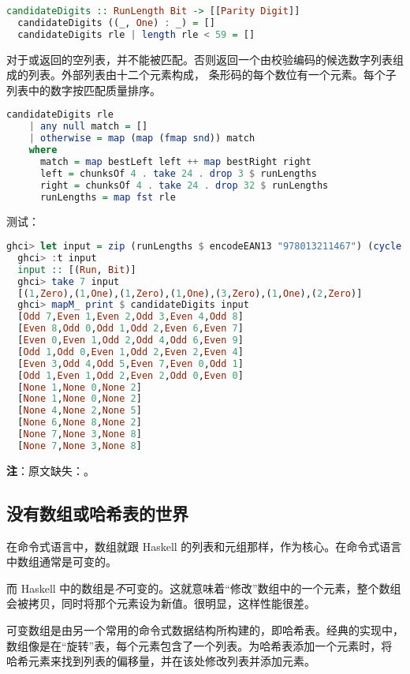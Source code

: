 \documentclass[./main.tex]{subfiles}
\begin{document}
\begin{lstlisting}[language=Haskell]
  candidateDigits :: RunLength Bit -> [[Parity Digit]]
  candidateDigits ((_, One) : _) = []
  candidateDigits rle | length rle < 59 = []
\end{lstlisting}

对于或返回的空列表，并不能被匹配。否则返回一个由校验编码的候选数字列表组成的列表。外部列表由十二个元素构成，
条形码的每个数位有一个元素。每个子列表中的数字按匹配质量排序。

\begin{lstlisting}[language=Haskell]
  candidateDigits rle
    | any null match = []
    | otherwise = map (map (fmap snd)) match
    where
      match = map bestLeft left ++ map bestRight right
      left = chunksOf 4 . take 24 . drop 3 $ runLengths
      right = chunksOf 4 . take 24 . drop 32 $ runLengths
      runLengths = map fst rle
\end{lstlisting}

测试：

\begin{lstlisting}[language=Haskell]
  ghci> let input = zip (runLengths $ encodeEAN13 "978013211467") (cycle [Zero, One])
  ghci> :t input
  input :: [(Run, Bit)]
  ghci> take 7 input
  [(1,Zero),(1,One),(1,Zero),(1,One),(3,Zero),(1,One),(2,Zero)]
  ghci> mapM_ print $ candidateDigits input
  [Odd 7,Even 1,Even 2,Odd 3,Even 4,Odd 8]
  [Even 8,Odd 0,Odd 1,Odd 2,Even 6,Even 7]
  [Even 0,Even 1,Odd 2,Odd 4,Odd 6,Even 9]
  [Odd 1,Odd 0,Even 1,Odd 2,Even 2,Even 4]
  [Even 3,Odd 4,Odd 5,Even 7,Even 0,Odd 1]
  [Odd 1,Even 1,Odd 2,Even 2,Odd 0,Even 0]
  [None 1,None 0,None 2]
  [None 1,None 0,None 2]
  [None 4,None 2,None 5]
  [None 6,None 8,None 2]
  [None 7,None 3,None 8]
  [None 7,None 3,None 8]
\end{lstlisting}

\textbf{注}：原文缺失：。

\subsection*{没有数组或哈希表的世界}

在命令式语言中，数组就跟 Haskell 的列表和元组那样，作为核心。在命令式语言中数组通常是可变的。

而 Haskell 中的数组是\textit{不}可变的。这就意味着“修改”数组中的一个元素，整个数组会被拷贝，同时将那个元素设为新值。很明显，这样性能很差。

可变数组是由另一个常用的命令式数据结构所构建的，即哈希表。经典的实现中，数组像是在“旋转”表，每个元素包含了一个列表。为哈希表添加一个元素时，将
哈希元素来找到列表的偏移量，并在该处修改列表并添加元素。
\end{document}
